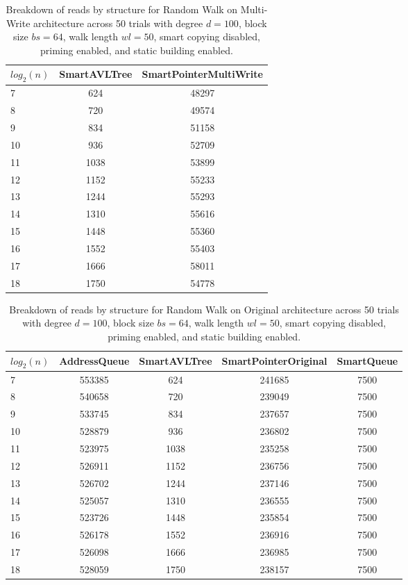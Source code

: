 \begin{table}[]
\centering
\begin{tabular}{|l|c|c|}
$log_2(n)$ & SmartAVLTree & SmartPointerMultiWrite \\ \hline
7 & 624 & 48297 \\ \hline
8 & 720 & 49574 \\ \hline
9 & 834 & 51158 \\ \hline
10 & 936 & 52709 \\ \hline
11 & 1038 & 53899 \\ \hline
12 & 1152 & 55233 \\ \hline
13 & 1244 & 55293 \\ \hline
14 & 1310 & 55616 \\ \hline
15 & 1448 & 55360 \\ \hline
16 & 1552 & 55403 \\ \hline
17 & 1666 & 58011 \\ \hline
18 & 1750 & 54778 \\ \hline
\end{tabular}
\caption{Breakdown of reads by structure for Random Walk on Multi-Write architecture across 50 trials with degree $d=100$, block size $bs=64$, walk length $wl=50$, smart copying disabled, priming enabled, and static building enabled.}
    \label{tab:reads_by_structure_rw_d100_bs64_trials50_copiesfalse_primetrue_staticinsertiontrue_wl50_ptmultiwrite_movetrue}
\end{table}

\begin{table}[]
\centering
\begin{tabular}{|l|c|c|c|c|}
$log_2(n)$ & AddressQueue & SmartAVLTree & SmartPointerOriginal & SmartQueue \\ \hline
7 & 553385 & 624 & 241685 & 7500 \\ \hline
8 & 540658 & 720 & 239049 & 7500 \\ \hline
9 & 533745 & 834 & 237657 & 7500 \\ \hline
10 & 528879 & 936 & 236802 & 7500 \\ \hline
11 & 523975 & 1038 & 235258 & 7500 \\ \hline
12 & 526911 & 1152 & 236756 & 7500 \\ \hline
13 & 526702 & 1244 & 237146 & 7500 \\ \hline
14 & 525057 & 1310 & 236555 & 7500 \\ \hline
15 & 523726 & 1448 & 235854 & 7500 \\ \hline
16 & 526178 & 1552 & 236916 & 7500 \\ \hline
17 & 526098 & 1666 & 236985 & 7500 \\ \hline
18 & 528059 & 1750 & 238157 & 7500 \\ \hline
\end{tabular}
\caption{Breakdown of reads by structure for Random Walk on Original architecture across 50 trials with degree $d=100$, block size $bs=64$, walk length $wl=50$, smart copying disabled, priming enabled, and static building enabled.}
    \label{tab:reads_by_structure_rw_d100_bs64_trials50_copiesfalse_primetrue_staticinsertiontrue_wl50_ptoriginal_movefalse}
\end{table}


